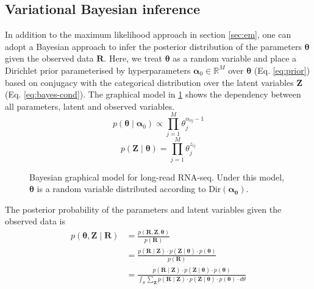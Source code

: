 \subsection{Variational Bayesian inference}

In addition to the maximum likelihood approach in section \ref{sec:em}, one can adopt a Bayesian approach to infer the posterior distribution of the parameters $\bm\theta$ given the observed data $\bm{R}$. Here, we treat $\bm\theta$ as a random variable and place a Dirichlet prior parameterised by hyperparameters $\bm\alpha_0\in\mathbb{R}^{M}$ over $\bm{\theta}$ (Eq. \ref{eq:prior}) based on conjugacy with the categorical distribution over the latent variables $\bm{Z}$  (Eq. \ref{eq:bayes-cond}). The graphical model in \ref{fig:graphical-model-2} shows the dependency between all parameters, latent and observed variables.  
\begin{equation}\label{eq:prior}
    p(\bm\theta\mid\bm\alpha_0)\propto \prod_{j=1}^M \theta_j^{\alpha_{0j}-1}
\end{equation}
\begin{equation}\label{eq:bayes-cond}
    p(\bm{Z}\mid\bm\theta)=\prod_{j=1}^M\theta_j^{z_{ij}}
\end{equation}
\begin{figure}[H]
    \centering
    \caption[Bayesian graphical model for long-read RNA-seq]{Bayesian graphical model for long-read RNA-seq. Under this model, $\bm\theta$ is a random variable distributed according to $\textrm{Dir}(\bm{\alpha_0})$.}
    \label{fig:graphical-model-2}
\end{figure}
\noindent The posterior probability of the parameters and latent variables given the observed data is 
\begin{equation}\label{eq:post-full}
\begin{split}
    p(\bm{\theta},\bm{Z}\mid\bm{R}) & =\frac{p(\bm{R},\bm{Z},\bm{\theta})}{p(\bm{R})} \\
    & = \frac{p(\bm{R}\mid\bm{Z})\cdot p(\bm{Z}\mid\bm{\theta})\cdot p(\bm{\theta})}{p(\bm{R})} \\
    & = \frac{p(\bm{R}\mid\bm{Z})\cdot p(\bm{Z}\mid\bm{\theta})\cdot p(\bm{\theta})}{\int_\theta \sum_{\bm{Z}} p(\bm{R}\mid\bm{Z})\cdot p(\bm{Z}\mid\bm{\theta})\cdot p(\bm{\theta})\cdot d\theta}
\end{split}
\end{equation}
